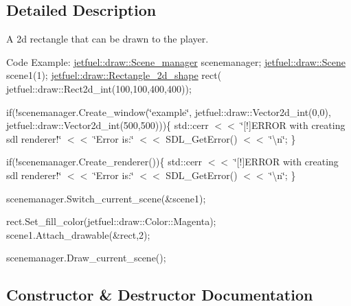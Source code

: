 \subsection{Detailed Description}
A 2d rectangle that can be drawn to the player.

Code Example\+: \hyperlink{classjetfuel_1_1draw_1_1Scene__manager}{jetfuel\+::draw\+::\+Scene\+\_\+manager} scenemanager; \hyperlink{classjetfuel_1_1draw_1_1Scene}{jetfuel\+::draw\+::\+Scene} scene1(1); \hyperlink{classjetfuel_1_1draw_1_1Rectangle__2d__shape}{jetfuel\+::draw\+::\+Rectangle\+\_\+2d\+\_\+shape} rect( jetfuel\+::draw\+::\+Rect2d\+\_\+int(100,100,400,400));

if(!scenemanager.Create\+\_\+window(\char`\"{}example\char`\"{}, jetfuel\+::draw\+::\+Vector2d\+\_\+int(0,0), jetfuel\+::draw\+::\+Vector2d\+\_\+int(500,500)))\{ std\+::cerr $<$$<$ \char`\"{}\mbox{[}!\mbox{]}\+E\+R\+R\+O\+R with creating sdl renderer!\char`\"{} $<$$<$ \char`\"{}\+Error is\+:\char`\"{} $<$$<$ S\+D\+L\+\_\+\+Get\+Error() $<$$<$ \char`\"{}\textbackslash{}n\char`\"{}; \}

if(!scenemanager.Create\+\_\+renderer())\{ std\+::cerr $<$$<$ \char`\"{}\mbox{[}!\mbox{]}\+E\+R\+R\+O\+R with creating sdl renderer!\char`\"{} $<$$<$ \char`\"{}\+Error is\+:\char`\"{} $<$$<$ S\+D\+L\+\_\+\+Get\+Error() $<$$<$ \char`\"{}\textbackslash{}n\char`\"{}; \}

scenemanager.\+Switch\+\_\+current\+\_\+scene(\&scene1);

rect.\+Set\+\_\+fill\+\_\+color(jetfuel\+::draw\+::\+Color\+::\+Magenta); scene1.\+Attach\+\_\+drawable(\&rect,2);

scenemanager.\+Draw\+\_\+current\+\_\+scene(); 

\subsection{Constructor \& Destructor Documentation}
\mbox{\label{classjetfuel_1_1draw_1_1Rectangle__2d__shape_a4ee9006d8e9d043092eff698ab484210}} 

